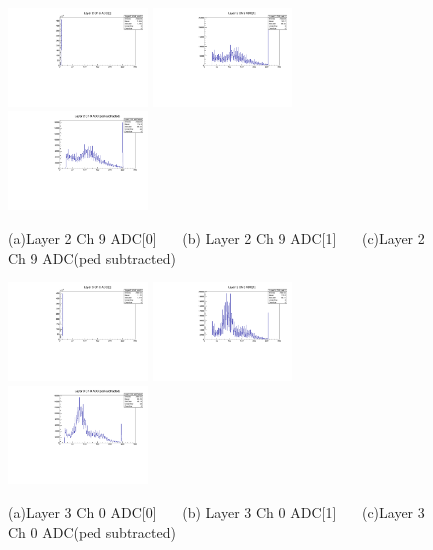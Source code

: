 \documentclass[a4paper,11pt]{article}
\theoremstyle{mytheor}
\begin{document}
\begin{figure}[H] 
\vspace*{-0.3cm} 
\includegraphics[width=0.33\textwidth,scale=0.5,trim=0 0 0 0,clip]{plotsdir/file0_test-Layer2_Ch9_adc0-1.pdf} 
\includegraphics[width=0.33\textwidth,scale=0.5,trim=0 0 0 0,clip]{plotsdir/file0_test-Layer2_Ch9_adc1-1.pdf} 
\includegraphics[width=0.33\textwidth,scale=0.5,trim=0 0 0 0,clip]{plotsdir/file0_test-Layer2_Ch9_adcPedsub-1.pdf} 
\caption{(a)Layer 2 Ch 9 ADC[0] ~~~(b) Layer 2 Ch 9 ADC[1] ~~~(c)Layer 2 Ch 9 ADC(ped subtracted) } 
\end{figure} 
\begin{figure}[H] 
\vspace*{-0.3cm} 
\includegraphics[width=0.33\textwidth,scale=0.5,trim=0 0 0 0,clip]{plotsdir/file0_test-Layer3_Ch0_adc0-1.pdf} 
\includegraphics[width=0.33\textwidth,scale=0.5,trim=0 0 0 0,clip]{plotsdir/file0_test-Layer3_Ch0_adc1-1.pdf} 
\includegraphics[width=0.33\textwidth,scale=0.5,trim=0 0 0 0,clip]{plotsdir/file0_test-Layer3_Ch0_adcPedsub-1.pdf} 
\caption{(a)Layer 3 Ch 0 ADC[0] ~~~(b) Layer 3 Ch 0 ADC[1] ~~~(c)Layer 3 Ch 0 ADC(ped subtracted) } 
\end{figure} 
\end{document}
